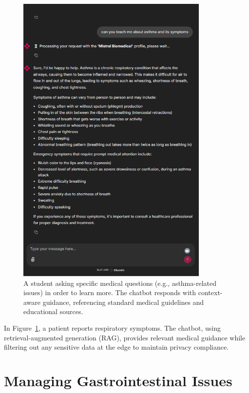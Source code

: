 \begin{figure}[htbp]
    \centering
    \includegraphics[width=0.85\textwidth]{Images/stuentquestion.png}
    \caption{A student asking specific medical questions (e.g., asthma-related issues) in order to learn more. The chatbot responds with context-aware guidance, referencing standard medical guidelines and educational sources.}
    \label{fig:patient-symptoms}
\end{figure}

In Figure~\ref{fig:patient-symptoms}, a patient reports respiratory symptoms. The chatbot, using retrieval-augmented generation (RAG), provides relevant medical guidance while filtering out any sensitive data at the edge to maintain privacy compliance.

\section{Managing Gastrointestinal Issues}
\label{sec:diarrhea-question}

